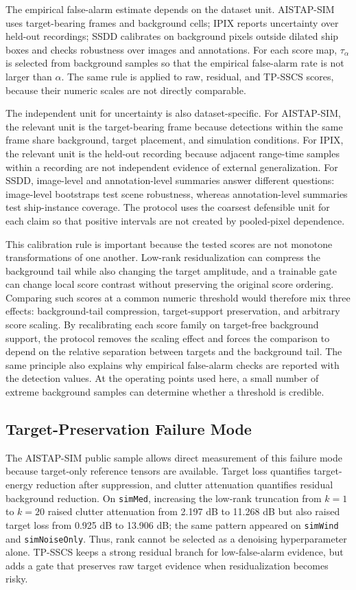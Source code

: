 \documentclass[journal]{IEEEtran}
\begin{document}
The empirical false-alarm estimate depends on the dataset unit. AISTAP-SIM uses target-bearing frames and background cells; IPIX reports uncertainty over held-out recordings; SSDD calibrates on background pixels outside dilated ship boxes and checks robustness over images and annotations. For each score map, $\tau_\alpha$ is selected from background samples so that the empirical false-alarm rate is not larger than $\alpha$. The same rule is applied to raw, residual, and TP-SSCS scores, because their numeric scales are not directly comparable.

The independent unit for uncertainty is also dataset-specific. For AISTAP-SIM, the relevant unit is the target-bearing frame because detections within the same frame share background, target placement, and simulation conditions. For IPIX, the relevant unit is the held-out recording because adjacent range-time samples within a recording are not independent evidence of external generalization. For SSDD, image-level and annotation-level summaries answer different questions: image-level bootstraps test scene robustness, whereas annotation-level summaries test ship-instance coverage. The protocol uses the coarsest defensible unit for each claim so that positive intervals are not created by pooled-pixel dependence.

This calibration rule is important because the tested scores are not monotone transformations of one another. Low-rank residualization can compress the background tail while also changing the target amplitude, and a trainable gate can change local score contrast without preserving the original score ordering. Comparing such scores at a common numeric threshold would therefore mix three effects: background-tail compression, target-support preservation, and arbitrary score scaling. By recalibrating each score family on target-free background support, the protocol removes the scaling effect and forces the comparison to depend on the relative separation between targets and the background tail. The same principle also explains why empirical false-alarm checks are reported with the detection values. At the operating points used here, a small number of extreme background samples can determine whether a threshold is credible.

\subsection{Target-Preservation Failure Mode}

The AISTAP-SIM public sample allows direct measurement of this failure mode because target-only reference tensors are available. Target loss quantifies target-energy reduction after suppression, and clutter attenuation quantifies residual background reduction. On \texttt{simMed}, increasing the low-rank truncation from $k=1$ to $k=20$ raised clutter attenuation from 2.197 dB to 11.268 dB but also raised target loss from 0.925 dB to 13.906 dB; the same pattern appeared on \texttt{simWind} and \texttt{simNoiseOnly}. Thus, rank cannot be selected as a denoising hyperparameter alone. TP-SSCS keeps a strong residual branch for low-false-alarm evidence, but adds a gate that preserves raw target evidence when residualization becomes risky.
\end{document}
